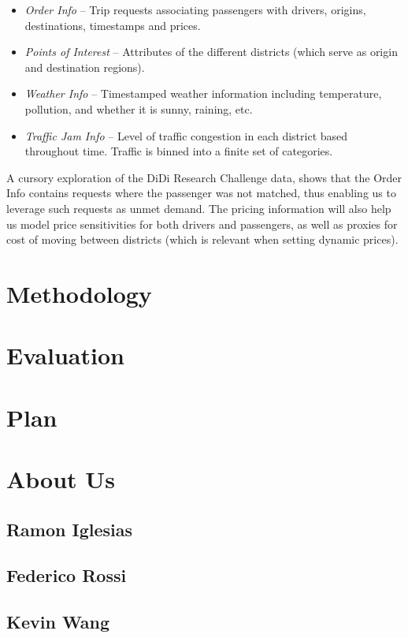 \documentclass[10pt]{article}
\begin{document}
\begin{itemize}
  \item {\emph{Order Info}} -- Trip requests associating passengers with drivers, origins, destinations, timestamps and prices. 
  \item {\emph{Points of Interest}} -- Attributes of the different districts (which serve as origin and destination regions).
  \item {\emph{Weather Info}} -- Timestamped weather information including temperature, pollution, and whether it is sunny, raining, etc.
  \item {\emph{Traffic Jam Info}} -- Level of traffic congestion in each district based throughout time. Traffic is binned into a finite set of categories.
\end{itemize}

A cursory exploration of the DiDi Research Challenge data, shows that the Order Info contains requests where the passenger was not matched, thus enabling us to leverage such requests as unmet demand. The pricing information will also help us model price sensitivities for both drivers and passengers, as well as proxies for cost of moving between districts (which is relevant when setting dynamic prices).

\section{Methodology}\label{methods}


\section{Evaluation}\label{evaluation}


\section{Plan}\label{plan}


\section{About Us}\label{about}

\subsection*{Ramon Iglesias}
\subsection*{Federico Rossi}
\subsection*{Kevin Wang}



\end{document}
